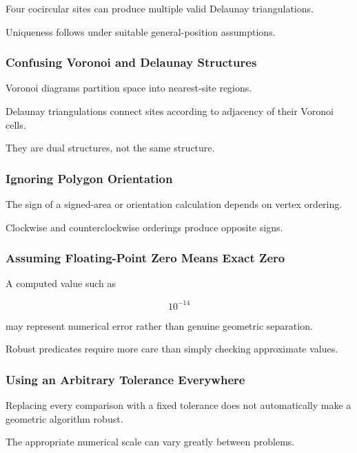 Four cocircular sites can produce multiple valid Delaunay triangulations.

Uniqueness follows under suitable general-position assumptions.

\subsubsection{Confusing Voronoi and Delaunay Structures}

Voronoi diagrams partition space into nearest-site regions.

Delaunay triangulations connect sites according to adjacency of their
Voronoi cells.

They are dual structures, not the same structure.

\subsubsection{Ignoring Polygon Orientation}

The sign of a signed-area or orientation calculation depends on vertex
ordering.

Clockwise and counterclockwise orderings produce opposite signs.

\subsubsection{Assuming Floating-Point Zero Means Exact Zero}

A computed value such as

\[
10^{-14}
\]

may represent numerical error rather than genuine geometric separation.

Robust predicates require more care than simply checking approximate values.

\subsubsection{Using an Arbitrary Tolerance Everywhere}

Replacing every comparison with a fixed tolerance does not automatically
make a geometric algorithm robust.

The appropriate numerical scale can vary greatly between problems.

